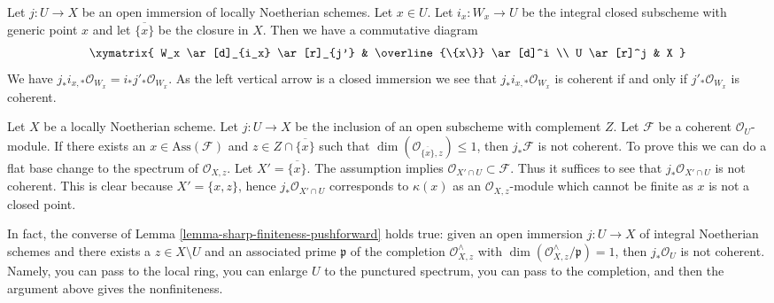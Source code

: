 \begin{remark}
\label{remark-closure}
Let $j : U \to X$ be an open immersion of locally Noetherian schemes.
Let $x \in U$. Let $i_x : W_x \to U$ be the integral closed subscheme
with generic point $x$ and let $\overline{\{x\}}$ be the closure in $X$.
Then we have a commutative diagram
$$
\xymatrix{
W_x \ar[d]_{i_x} \ar[r]_{j'} & \overline{\{x\}} \ar[d]^i \\
U \ar[r]^j & X
}
$$
We have $j_*i_{x, *}\mathcal{O}_{W_x} = i_*j'_*\mathcal{O}_{W_x}$.
As the left vertical arrow is a closed immersion we see that
$j_*i_{x, *}\mathcal{O}_{W_x}$ is coherent if and only if
$j'_*\mathcal{O}_{W_x}$ is coherent.
\end{remark}

\begin{remark}
\label{remark-no-finiteness-pushforward}
Let $X$ be a locally Noetherian scheme. Let $j : U \to X$ be the inclusion of
an open subscheme with complement $Z$. Let $\mathcal{F}$ be a coherent
$\mathcal{O}_U$-module. If there exists an $x \in \text{Ass}(\mathcal{F})$ and
$z \in Z \cap \overline{\{x\}}$ such that
$\dim(\mathcal{O}_{\overline{\{x\}}, z}) \leq 1$, then $j_*\mathcal{F}$ is not
coherent. To prove this we can do a flat base change to the spectrum
of $\mathcal{O}_{X, z}$. Let $X' = \overline{\{x\}}$.
The assumption implies $\mathcal{O}_{X' \cap U} \subset \mathcal{F}$.
Thus it suffices to see that $j_*\mathcal{O}_{X' \cap U}$ is not
coherent. This is clear because $X' = \{x, z\}$, hence
$j_*\mathcal{O}_{X' \cap U}$ corresponds to $\kappa(x)$ as an
$\mathcal{O}_{X, z}$-module which cannot be finite as $x$ is not
a closed point.

\medskip\noindent
In fact, the converse of Lemma \ref{lemma-sharp-finiteness-pushforward}
holds true: given an open immersion $j : U \to X$ of integral Noetherian
schemes and there exists a $z \in X \setminus U$ and an associated prime
$\mathfrak p$ of the completion $\mathcal{O}_{X, z}^\wedge$
with $\dim(\mathcal{O}_{X, z}^\wedge/\mathfrak p) = 1$,
then $j_*\mathcal{O}_U$ is not coherent. Namely, you can pass to
the local ring, you can enlarge $U$ to the punctured spectrum,
you can pass to the completion, and then the argument above gives
the nonfiniteness.
\end{remark}

